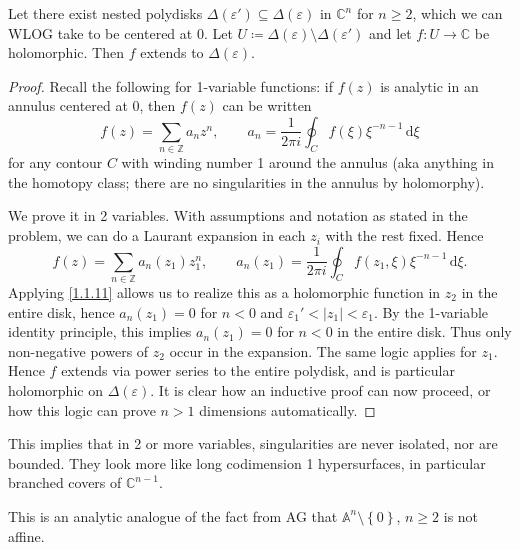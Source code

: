 
\begin{theorem}\label{1.1.19}
	Let there exist nested polydisks $\Delta (\varepsilon ')\subseteq \Delta (\varepsilon )$ in $\mathbb{C} ^n$ for $n\geq 2$, which we can WLOG take to be centered at 0. Let $U\coloneqq \Delta (\varepsilon )\setminus \Delta (\varepsilon ')$ and let $f : U \to \mathbb{C} $ be holomorphic. Then $f$ extends to $\Delta (\varepsilon )$.
\end{theorem}
\begin{proof}
	Recall the following for 1-variable functions: if $f(z)$ is analytic in an annulus centered at 0, then $f(z)$ can be written
	\[
		f(z)=\sum_{n\in\mathbb{Z} } a_nz^n,\qquad a_n=\frac{1}{2\pi i} \oint_Cf(\xi )\xi ^{-n-1} \,\mathrm{d} \xi 
	\]
	for any contour $C$ with winding number 1 around the annulus (aka anything in the homotopy class; there are no singularities in the annulus by holomorphy).

	We prove it in 2 variables. With assumptions and notation as stated in the problem, we can do a Laurant expansion in each $z_i$ with the rest fixed. Hence
	\[
		f(z)=\sum_{n\in\mathbb{Z} } a_n(z_1)z_1^n,\qquad a_n(z_1)=\frac{1}{2\pi i} \oint_{C} f(z_1,\xi )\xi ^{-n-1}  \,\mathrm{d} \xi 
	.\]
	Applying \cref{1.1.11} allows us to realize this as a holomorphic function in $z_2$ in the entire disk, hence $a_n(z_1)=0$ for $n<0$ and $\varepsilon _1'<\left| z_1 \right| <\varepsilon _1$. By the 1-variable identity principle, this implies $a_n(z_1)=0$ for $n<0$ in the entire disk. Thus only non-negative powers of $z_2$ occur in the expansion. The same logic applies for $z_1$. Hence $f$ extends via power series to the entire polydisk, and is particular holomorphic on $\Delta (\varepsilon )$. It is clear how an inductive proof can now proceed, or how this logic can prove $n>1$ dimensions automatically.
\end{proof}
\begin{remark}\label{1.1.20}
	This implies that in 2 or more variables, singularities are never isolated, nor are bounded. They look more like long codimension 1 hypersurfaces, in particular branched covers of $\mathbb{C} ^{n-1}$.
\end{remark}
\begin{remark}\label{1.1.21}
	This is an analytic analogue of the fact from AG that $\mathbb{A} ^n\setminus \left\{ 0 \right\} $, $n\geq 2$ is not affine.
\end{remark}

